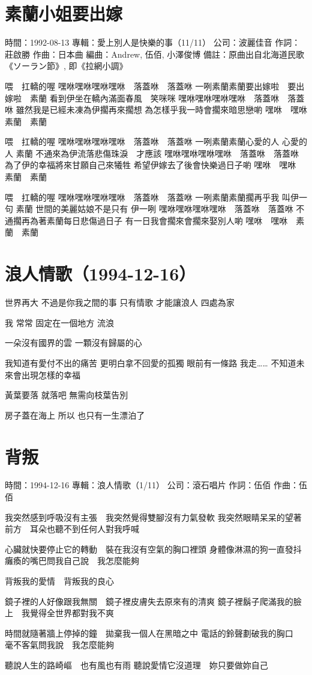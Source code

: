 \documentclass[UTF8,a4paper,oneside,twocolumn,12pt]{ctexbook}
\newcommand{\infopair}[2]{\textbullet #1：#2}
\newcommand{\zc}[1][伍佰]{\infopair{作詞}{#1}}
\newcommand{\zq}[1][伍佰]{\infopair{作曲}{#1}}
\newcommand{\bq}[1][伍佰]{\infopair{編曲}{#1}}
\newcommand{\zj}[1]{\infopair{專輯}{#1}}
\newcommand{\sj}[1]{\infopair{時間}{#1}}
\newcommand{\bz}[1]{\infopair{備註}{#1}}
\newcommand{\gs}[1]{\infopair{公司}{#1}}
\newenvironment{info}{\begin{flushleft}\kaishu
	}
	{\end{flushleft}\normalsize\yahei\par}
\newenvironment{lyric}{
	}
{}
\begin{document}
\section{素蘭小姐要出嫁}
\begin{info}
	\sj{1992-08-13}
	\zj{愛上別人是快樂的事（11/11）}
	\gs{波麗佳音}
	\zc[莊啟勝]
	\zq[日本曲]
	\bq[Andrew, 伍佰, 小澤俊博]
	\bz{原曲出自北海道民歌《ソーラン節》, 即《拉網小調》}
\end{info}
\begin{lyric}
	喂　扛轎的喔
	嘿咻嘿咻嘿咻嘿咻　落蓋咻　落蓋咻
	一咧素蘭素蘭要出嫁啦　要出嫁啦　素蘭
	看到伊坐在轎內滿面春風　笑咪咪
	嘿咻嘿咻嘿咻嘿咻　落蓋咻　落蓋咻
	雖然我是已經未凍為伊擱再來擱想
	為怎樣乎我一時會擱來暗思戀喲
	嘿咻　嘿咻　素蘭　素蘭

	喂　扛轎的喔
	嘿咻嘿咻嘿咻嘿咻　落蓋咻　落蓋咻
	一咧素蘭素蘭心愛的人 心愛的人 素蘭
	不通來為伊流落悲傷珠淚　才應該
	嘿咻嘿咻嘿咻嘿咻　落蓋咻　落蓋咻
	為了伊的幸福將來甘願自己來犧牲
	希望伊嫁去了後會快樂過日子喲
	嘿咻　嘿咻　素蘭　素蘭

	喂　扛轎的喔
	嘿咻嘿咻嘿咻嘿咻　落蓋咻　落蓋咻
	一咧素蘭素蘭擱再乎我 叫伊一句 素蘭
	世間的美麗姑娘不是只有 伊一咧
	嘿咻嘿咻嘿咻嘿咻　落蓋咻　落蓋咻
	不通擱再為著素蘭每日悲傷過日子
	有一日我會擱來會擱來娶別人喲
	嘿咻　嘿咻　素蘭　素蘭
\end{lyric}

\section*{浪人情歌（1994-12-16）}
世界再大 不過是你我之間的事
只有情歌 才能讓浪人 四處為家

我 常常 固定在一個地方 流浪

一朵沒有國界的雲 一顆沒有歸屬的心

我知道有愛付不出的痛苦
更明白拿不回愛的孤獨
眼前有一條路 我走……
不知道未來會出現怎樣的幸福

黃葉要落 就落吧
無需向枝葉告別

房子蓋在海上 所以 也只有一生漂泊了

\section{背叛}
\begin{info}
	\sj{1994-12-16}
	\zj{浪人情歌（1/11）}
	\gs{滾石唱片}
	\zc
	\zq
\end{info}
\begin{lyric}
	我突然感到呼吸沒有主張　我突然覺得雙腳沒有力氣發軟
	我突然眼睛呆呆的望著前方　耳朵也聽不到任何人對我呼喊

	心臟就快要停止它的轉動　裝在我沒有空氣的胸口裡頭
	身體像淋濕的狗一直發抖　癱瘓的嘴巴問我自己說　我怎麼能夠

	背叛我的愛情　背叛我的良心

	鏡子裡的人好像跟我無關　鏡子裡皮膚失去原來有的清爽
	鏡子裡鬍子爬滿我的臉上　我覺得全世界都對我不爽

	時間就隨著牆上停掉的鐘　拋棄我一個人在黑暗之中
	電話的鈴聲劃破我的胸口　毫不客氣問我說　我怎麼能夠

	聽說人生的路崎嶇　也有風也有雨
	聽說愛情它沒道理　妳只要做妳自己
\end{lyric}
\end{document}
